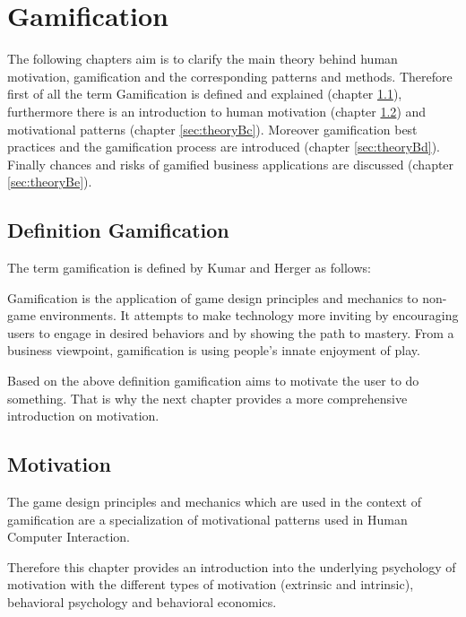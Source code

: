 \newpage
\section{Gamification}
\label{sec:theoryB}

The following chapters aim is to clarify the main theory behind human motivation, gamification and the corresponding patterns and methods. Therefore first of all the term Gamification is defined and explained (chapter \ref{sec:theoryBa}), furthermore there is an introduction to human motivation (chapter \ref{sec:theoryBb}) and motivational patterns (chapter \ref{sec:theoryBc}). Moreover gamification best practices and the gamification process are introduced (chapter \ref{sec:theoryBd}). Finally chances and risks of gamified business applications are discussed (chapter \ref{sec:theoryBe}).


\subsection{Definition Gamification}
\label{sec:theoryBa}

The term gamification is defined by Kumar and Herger as follows:

\begin{fquote}
	Gamification is the application of game design principles and mechanics to
	non-game environments. It attempts to make technology more inviting by encouraging users to engage in desired behaviors and by showing the path to mastery.
	From a business viewpoint, gamification is using people’s innate enjoyment of play.
\end{fquote}

Based on the above definition gamification aims to motivate the user to do something. That is why the next chapter provides a more comprehensive introduction on motivation. \cite[p. 8]{inproceedings}


\subsection{Motivation}
\label{sec:theoryBb}

The game design principles and mechanics which are used in the context of gamification are a specialization of motivational patterns used in Human Computer Interaction. \cite[p. 59]{inproceedings}

Therefore this chapter provides an introduction into the underlying psychology of motivation with the different types of motivation (extrinsic and intrinsic), behavioral psychology and behavioral economics.

